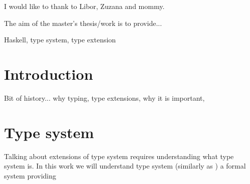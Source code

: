 \documentclass[11pt,oneside,draft]{fithesis2}
\renewcommand{\to}{\mathrel{\mathop{\chemarrow}}}
\theoremstyle{definition}
\begin{document}
\FrontMatter
\ThesisTitlePage

\begin{ThesisDeclaration}
\DeclarationText
\AdvisorName
\end{ThesisDeclaration}

\begin{ThesisThanks}
I would like to thank to Libor, Zuzana and mommy.
\end{ThesisThanks}

\begin{ThesisAbstract}
The aim of the master's thesis/work is to provide...
\end{ThesisAbstract}

\begin{ThesisKeyWords}
Haskell, type system, type extension
\end{ThesisKeyWords}

\clearpage
{}
{}
\tableofcontents

\clearpage
{}
{}
\listoffigures

\MainMatter

\chapter{Introduction}

Bit of history... why typing, type extensions, why it is important,

\chapter{Type system}


Talking about extensions of type system requires understanding what type system is.
In this work we will understand type system (similarly as
\cite{pierce:2002:types,barendregt:1992:lambdaProc}) a formal system providing
\end{document}

